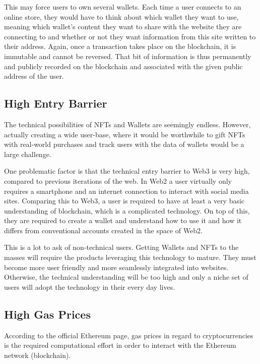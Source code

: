This may force users to own several wallets. Each time a user connects to an online store, they would have to think about which wallet they want to use, meaning which wallet's content they want to share with the website they are connecting to and whether or not they want information from this site written to their address. Again, once a transaction takes place on the blockchain, it is immutable and cannot be reversed. That bit of information is thus permanently and publicly recorded on the blockchain and associated with the given public address of the user.


%
%
\subsection{High Entry Barrier}
\label{sub:results:barrier}
The technical possibilities of NFTs and Wallets are seemingly endless. However, actually creating a wide user-base, where it would be worthwhile to gift NFTs with real-world purchases and track users with the data of wallets would be a large challenge.

One problematic factor is that the technical entry barrier to Web3 is very high, compared to previous iterations of the web. In Web2 a user virtually only requires a smartphone and an internet connection to interact with social media sites. Comparing this to Web3, a user is required to have at least a very basic understanding of blockchain, which is a complicated technology. On top of this, they are required to create a wallet and understand how to use it and how it differs from conventional accounts created in the space of Web2.

This is a lot to ask of non-technical users. Getting Wallets and NFTs to the masses will require the products leveraging this technology to mature. They must become more user friendly and more seamlessly integrated into websites. Otherwise, the technical understanding will be too high and only a niche set of users will adopt the technology in their every day lives.

%
%
\subsection{High Gas Prices}
\label{sub:results:barrier}
According to the official Ethereum page, gas prices in regard to cryptocurrencies is the required computational effort in order to interact with the Ethereum network (blockchain). \cite{ether}

